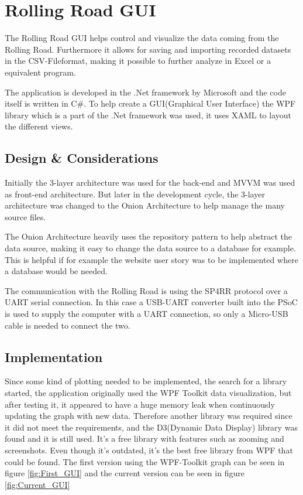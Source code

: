 \section{Rolling Road GUI}
The Rolling Road GUI helps control and visualize the data coming from the Rolling Road. Furthermore it allows for saving and importing recorded datasets in the CSV-Fileformat, making it possible to further analyze in Excel or a equivalent program.

The application is developed in the .Net framework by Microsoft and the code itself is written in C\#.
To help create a GUI(Graphical User Interface) the WPF library which is a part of the .Net framework was used, it uses XAML to layout the different views.

\subsection{Design \& Considerations}
Initially the 3-layer architecture was used for the back-end and MVVM was used as front-end architecture. But later in the development cycle, the 3-layer architecture was changed to the Onion Architecture to help manage the many source files.

The Onion Architecture heavily uses the repository pattern to help abstract the data source, making it easy to change the data source to a database for example. This is helpful if for example the website user story was to be implemented where a database would be needed.

The communication with the Rolling Road is using the SP4RR protocol over a UART serial connection. In this case a USB-UART converter built into the PSoC is used to supply the computer with a UART connection, so only a Micro-USB cable is needed to connect the two.

\subsection{Implementation}
Since some kind of plotting needed to be implemented, the search for a library started, the application originally used the WPF Toolkit data visualization\cite{WPf_Toolkit}, but after testing it, it appeared to have a huge memory leak when continuously updating the graph with new data. Therefore another library was required since it did not meet the requirements, and the D3(Dynamic Data Display) library\cite{WPf_D3} was found and it is still used. It's a free library with features such as zooming and screenshots. Even though it's outdated, it's the best free library from WPF that could be found. The first version using the WPF-Toolkit graph can be seen in figure \vref{fig:First_GUI} and the current version can be seen in figure \vref{fig:Current_GUI}

